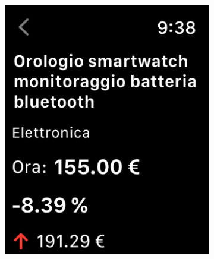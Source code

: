 \begin{figure}[h!]
        \centering
        \begin{subfigure}[b]{0.3\textwidth}
            \centering
            \includegraphics[width=\textwidth]{images/interfaces/watch_product_1.png}
        \end{subfigure}
        \begin{subfigure}[b]{0.3\textwidth}
            \centering

\end{subfigure}
\end{figure}
